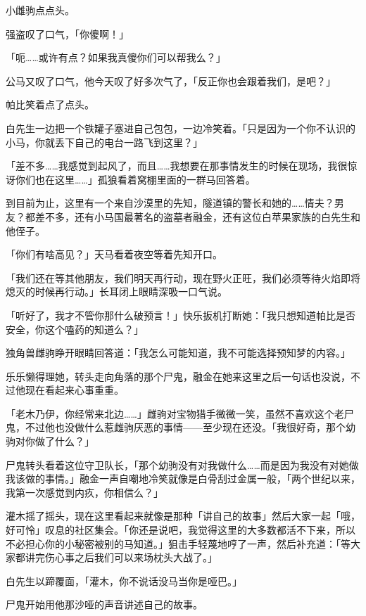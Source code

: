 小雌驹点点头。

强盗叹了口气，「你傻啊！」

「呃……或许有点？如果我真傻你们可以帮我么？」

公马又叹了口气，他今天叹了好多次气了，「反正你也会跟着我们，是吧？」

帕比笑着点了点头。

\horizonline


白先生一边把一个铁罐子塞进自己包包，一边冷笑着。「只是因为一个你不认识的小马，你就丢下自己的电台一路飞到这里？」

「差不多……我感觉到起风了，而且……我想要在那事情发生的时候在现场，我很惊讶你们也在这里……」孤狼看着窝棚里面的一群马回答着。

到目前为止，这里有一个来自沙漠里的先知，隧道镇的警长和她的……情夫？男友？都差不多，还有小马国最著名的盗墓者融金，还有这位白苹果家族的白先生和他侄子。

「你们有啥高见？」天马看着夜空等着先知开口。

「我们还在等其他朋友，我们明天再行动，现在野火正旺，我们必须等待火焰即将熄灭的时候再行动。」长耳闭上眼睛深吸一口气说。

「听好了，我才不管你那什么破预言！」快乐扳机打断她：「我只想知道帕比是否安全，你这个嗑药的知道么？」

独角兽雌驹睁开眼睛回答道：「我怎么可能知道，我不可能选择预知梦的内容。」

乐乐懒得理她，转头走向角落的那个尸鬼，融金在她来这里之后一句话也没说，不过他现在看起来心事重重。

「老木乃伊，你经常来北边……」雌驹对宝物猎手微微一笑，虽然不喜欢这个老尸鬼，不过他也没做什么惹雌驹厌恶的事情——至少现在还没。「我很好奇，那个幼驹对你做了什么？」

尸鬼转头看着这位守卫队长，「那个幼驹没有对我做什么……而是因为我没有对她做我该做的事情。」融金一声自嘲地冷笑就像是白骨刮过金属一般，「两个世纪以来，我第一次感觉到内疚，你相信么？」

灌木摇了摇头，现在这里看起来就像是那种「讲自己的故事」然后大家一起「哦，好可怜」叹息的社区集会。「你还是说吧，我觉得这里的大多数都活不下来，所以不必担心你的小秘密被别的马知道。」狙击手轻蔑地哼了一声，然后补充道：「等大家都讲完伤心事之后我们可以来场枕头大战了。」

白先生以蹄覆面，「灌木，你不说话没马当你是哑巴。」

尸鬼开始用他那沙哑的声音讲述自己的故事。

